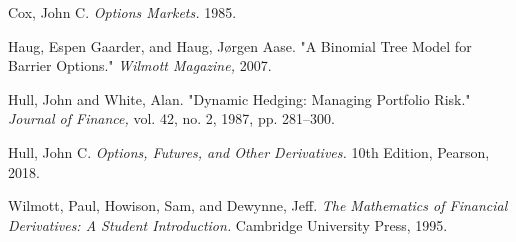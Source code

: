 \begin{thebibliography}{9}

Cox, John C. 
\textit{Options Markets.} 1985.

Haug, Espen Gaarder, and Haug, Jørgen Aase. 
"A Binomial Tree Model for Barrier Options." 
\textit{Wilmott Magazine,} 2007.

Hull, John and White, Alan. 
"Dynamic Hedging: Managing Portfolio Risk." 
\textit{Journal of Finance,} vol. 42, no. 2, 1987, pp. 281--300.

Hull, John C. 
\textit{Options, Futures, and Other Derivatives.} 10th Edition, Pearson, 2018.

Wilmott, Paul, Howison, Sam, and Dewynne, Jeff. 
\textit{The Mathematics of Financial Derivatives: A Student Introduction.} Cambridge University Press, 1995.

\end{thebibliography}

